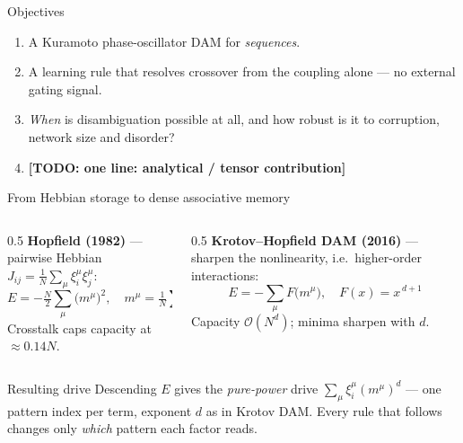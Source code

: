 \documentclass[aspectratio=169]{beamer}
\newcommand{\xxi}{\xi}
\newcommand{\mvar}{m}
\newcommand{\TODO}[1]{{\color{red}\textbf{[TODO: #1]}}}
\begin{document}
\begin{frame}{Objectives}
  \begin{enumerate}
    \item A Kuramoto phase-oscillator DAM for \emph{sequences}.
    \item A learning rule that resolves crossover from the coupling alone
      --- no external gating signal.
    \item \emph{When} is disambiguation possible at all, and how robust is
      it to corruption, network size and disorder?
    \item \TODO{one line: analytical / tensor contribution}
  \end{enumerate}
\end{frame}

\begin{frame}{From Hebbian storage to dense associative memory}
  \begin{columns}[T]
    \begin{column}{0.5\textwidth}
      \textbf{Hopfield (1982)} --- pairwise Hebbian
      $J_{ij} = \frac{1}{N}\sum_\mu \xxi_i^\mu \xxi_j^\mu$:
      \[
        E = -\tfrac{N}{2}\sum_\mu \bigl(\mvar^\mu\bigr)^2 ,\quad
        \mvar^\mu = \tfrac1N \sum_j \xxi^\mu_j s_j
      \]
      Crosstalk caps capacity at $\approx 0.14N$.
    \end{column}
    \begin{column}{0.5\textwidth}
      \textbf{Krotov--Hopfield DAM (2016)} --- sharpen the nonlinearity,
      i.e.\ higher-order interactions:
      \[
        E = -\sum_\mu F\bigl(\mvar^\mu\bigr), \quad F(x) = x^{\,d+1}
      \]
      Capacity $\mathcal{O}(N^{d})$; minima sharpen with $d$.
    \end{column}
  \end{columns}
  \vspace{3mm}
  \begin{block}{Resulting drive}
    Descending $E$ gives the \emph{pure-power} drive
    $\sum_\mu \xxi_i^\mu (\mvar^\mu)^{d}$ --- one pattern index per term,
    exponent $d$ as in Krotov DAM. Every rule that follows changes only
    \emph{which} pattern each factor reads.
  \end{block}
\end{frame}
\end{document}
